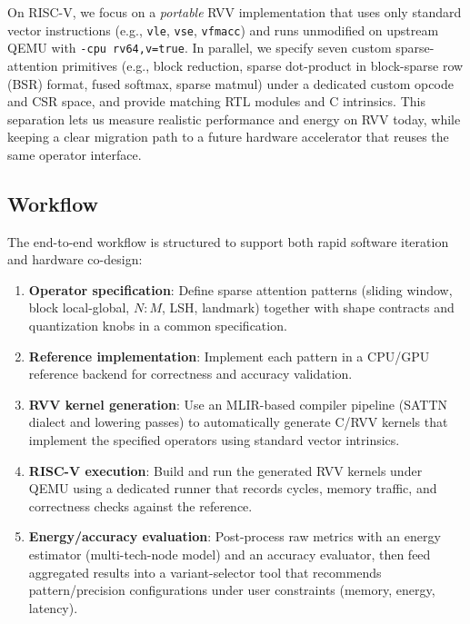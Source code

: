 \documentclass[10pt,conference]{IEEEtran}
\begin{document}
On RISC-V, we focus on a \emph{portable} RVV implementation that uses only standard vector instructions (e.g., \texttt{vle}, \texttt{vse}, \texttt{vfmacc}) and runs unmodified on upstream QEMU with \texttt{-cpu rv64,v=true}. In parallel, we specify seven custom sparse-attention primitives (e.g., block reduction, sparse dot-product in block-sparse row (BSR) format, fused softmax, sparse matmul) under a dedicated custom opcode and CSR space, and provide matching RTL modules and C intrinsics. This separation lets us measure realistic performance and energy on RVV today, while keeping a clear migration path to a future hardware accelerator that reuses the same operator interface.

\subsection{Workflow}
The end-to-end workflow is structured to support both rapid software iteration and hardware co-design:
\begin{enumerate}
    \item \textbf{Operator specification}: Define sparse attention patterns (sliding window, block local-global, $N\!:\!M$, LSH, landmark) together with shape contracts and quantization knobs in a common specification.
    \item \textbf{Reference implementation}: Implement each pattern in a CPU/GPU reference backend for correctness and accuracy validation.
    \item \textbf{RVV kernel generation}: Use an MLIR-based compiler pipeline (SATTN dialect and lowering passes) to automatically generate C/RVV kernels that implement the specified operators using standard vector intrinsics.
    \item \textbf{RISC-V execution}: Build and run the generated RVV kernels under QEMU using a dedicated runner that records cycles, memory traffic, and correctness checks against the reference.
    \item \textbf{Energy/accuracy evaluation}: Post-process raw metrics with an energy estimator (multi-tech-node model) and an accuracy evaluator, then feed aggregated results into a variant-selector tool that recommends pattern/precision configurations under user constraints (memory, energy, latency).
\end{enumerate}
\end{document}
